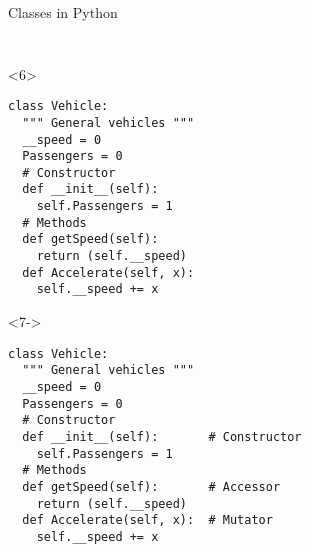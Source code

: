 \begin{frame}[fragile]{Classes in Python}
\begin{columns}[onlytextwidth]
\begin{column}{\textwidth}
\begin{onlyenv}
\begin{lstlisting}[style=python]
 \end{lstlisting}
      \end{onlyenv}

      \begin{onlyenv}<6>
        \begin{lstlisting}[style=python]
class Vehicle:
  """ General vehicles """
  __speed = 0
  Passengers = 0
  # Constructor
  def __init__(self):
    self.Passengers = 1
  # Methods
  def getSpeed(self):
    return (self.__speed)
  def Accelerate(self, x):
    self.__speed += x \end{lstlisting}
      \end{onlyenv}


      \begin{onlyenv}<7->
        \begin{lstlisting}[style=python]
class Vehicle:
  """ General vehicles """
  __speed = 0
  Passengers = 0
  # Constructor
  def __init__(self):       # Constructor
    self.Passengers = 1
  # Methods
  def getSpeed(self):       # Accessor
    return (self.__speed)
  def Accelerate(self, x):  # Mutator
    self.__speed += x \end{lstlisting}
      \end{onlyenv}

    \end{column}
  \end{columns}

\end{frame}


